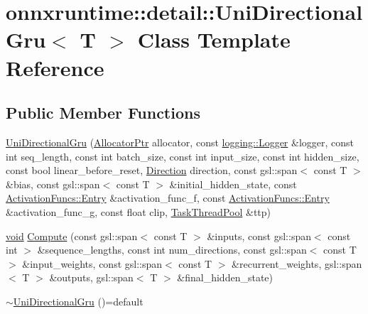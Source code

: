 \hypertarget{classonnxruntime_1_1detail_1_1UniDirectionalGru}{}\section{onnxruntime\+:\+:detail\+:\+:Uni\+Directional\+Gru$<$ T $>$ Class Template Reference}
\label{classonnxruntime_1_1detail_1_1UniDirectionalGru}
\subsection*{Public Member Functions}
\begin{DoxyCompactItemize}
\item 
\mbox{\hyperlink{classonnxruntime_1_1detail_1_1UniDirectionalGru_ac4d703da2103821622f78989354f4114}{Uni\+Directional\+Gru}} (\mbox{\hyperlink{namespaceonnxruntime_a6cdac724c5dcefded3a63f08dae58fda}{Allocator\+Ptr}} allocator, const \mbox{\hyperlink{classonnxruntime_1_1logging_1_1Logger}{logging\+::\+Logger}} \&logger, const int seq\+\_\+length, const int batch\+\_\+size, const int input\+\_\+size, const int hidden\+\_\+size, const bool linear\+\_\+before\+\_\+reset, \mbox{\hyperlink{namespaceonnxruntime_1_1rnn_1_1detail_a3a4cfb298df0a68436cdb8879647de1d}{Direction}} direction, const gsl\+::span$<$ const T $>$ \&bias, const gsl\+::span$<$ const T $>$ \&initial\+\_\+hidden\+\_\+state, const \mbox{\hyperlink{structonnxruntime_1_1rnn_1_1detail_1_1ActivationFuncs_1_1Entry}{Activation\+Funcs\+::\+Entry}} \&activation\+\_\+func\+\_\+f, const \mbox{\hyperlink{structonnxruntime_1_1rnn_1_1detail_1_1ActivationFuncs_1_1Entry}{Activation\+Funcs\+::\+Entry}} \&activation\+\_\+func\+\_\+g, const float clip, \mbox{\hyperlink{classonnxruntime_1_1TaskThreadPool}{Task\+Thread\+Pool}} \&ttp)
\item 
\mbox{\hyperlink{mlasi_8h_a88f941d423cb2a819b70a1358982b1a6}{void}} \mbox{\hyperlink{classonnxruntime_1_1detail_1_1UniDirectionalGru_a1b10ea620a8cc1e2957b01fabc9313f9}{Compute}} (const gsl\+::span$<$ const T $>$ \&inputs, const gsl\+::span$<$ const int $>$ \&sequence\+\_\+lengths, const int num\+\_\+directions, const gsl\+::span$<$ const T $>$ \&input\+\_\+weights, const gsl\+::span$<$ const T $>$ \&recurrent\+\_\+weights, gsl\+::span$<$ T $>$ \&outputs, gsl\+::span$<$ T $>$ \&final\+\_\+hidden\+\_\+state)
\item 
\mbox{\hyperlink{classonnxruntime_1_1detail_1_1UniDirectionalGru_a29256e87caca65d51c22e73a23d1298d}{$\sim$\+Uni\+Directional\+Gru}} ()=default
\end{DoxyCompactItemize}


